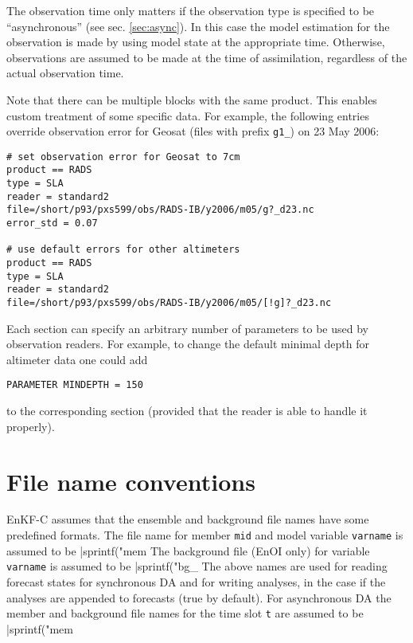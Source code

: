 \documentclass[11pt]{report}
\begin{document}
The observation time only matters if the observation type is specified to be ``asynchronous'' (see sec. \ref{sec:async}).
In this case the model estimation for the observation is made by using model state at the appropriate time.
Otherwise, observations are assumed to be made at the time of assimilation, regardless of the actual observation time.

Note that there can be multiple blocks with the same product.
This enables custom treatment of some specific data.
For example, the following entries override observation error for Geosat (files with prefix \verb|g1_|) on 23 May 2006:
\begin{Verbatim}[frame=single,fontsize=\footnotesize]
# set observation error for Geosat to 7cm
product == RADS
type = SLA
reader = standard2
file=/short/p93/pxs599/obs/RADS-IB/y2006/m05/g?_d23.nc
error_std = 0.07

# use default errors for other altimeters
product == RADS
type = SLA
reader = standard2
file=/short/p93/pxs599/obs/RADS-IB/y2006/m05/[!g]?_d23.nc
\end{Verbatim}

Each section can specify an arbitrary number of parameters to be used by observation readers.
For example, to change the default minimal depth for altimeter data one could add
\begin{Verbatim}
PARAMETER MINDEPTH = 150
\end{Verbatim}
to the corresponding section (provided that the reader is able to handle it properly).

\section{File name conventions}

EnKF-C assumes that the ensemble and background file names have some predefined formats.
The file name for member \verb|mid| and model variable \verb|varname| is assumed to be \spverb|sprintf("mem%
The background file (EnOI only) for variable \verb|varname| is assumed to be \spverb|sprintf("bg_%
The above names are used for reading forecast states for synchronous DA and for writing analyses, in the case if the analyses are appended to forecasts (true by default).
For asynchronous DA the member and background file names for the time slot \verb|t| are assumed to be \spverb|sprintf("mem%
\end{document}
